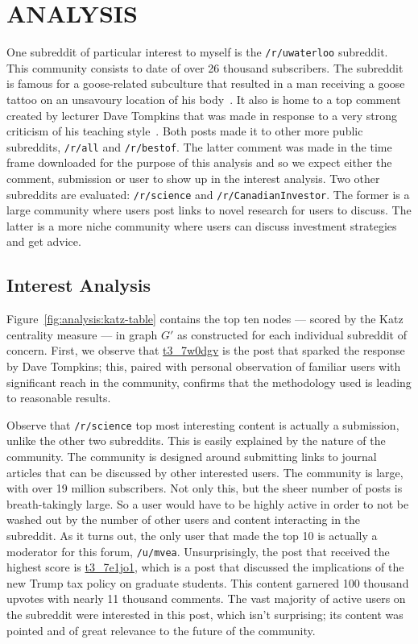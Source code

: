 \documentclass[letterpaper, 10 pt, conference]{ieeeconf}
\theoremstyle{definition}
\begin{document}
\section{ANALYSIS}\label{sec:analysis}
One subreddit of particular interest to myself is the \texttt{/r/uwaterloo} subreddit. This community consists to date of over 26 thousand subscribers. The subreddit is famous for a goose-related subculture that resulted in a man receiving a goose tattoo on an unsavoury location of his body~\cite{Website:GooseTattoo}. It also is home to a top comment created by lecturer Dave Tompkins that was made in response to a very strong criticism of his teaching style~\cite{Website:dtompkins}. Both posts made it to other more public subreddits, \texttt{/r/all} and \texttt{/r/bestof}. The latter comment was made in the time frame downloaded for the purpose of this analysis and so we expect either the comment, submission or user to show up in the interest analysis. Two other subreddits are evaluated: \texttt{/r/science} and \texttt{/r/CanadianInvestor}. The former is a large community where users post links to novel research for users to discuss. The latter is a more niche community where users can discuss investment strategies and get advice.

\subsection{Interest Analysis}\label{sec:analysis:interest}
Figure~\ref{fig:analysis:katz-table} contains the top ten nodes --- scored by the Katz centrality measure --- in graph \(G'\) as constructed for each individual subreddit of concern. First, we observe that \href{https://reddit.com/r/uwaterloo/comments/7w0dgv}{t3\_7w0dgv} is the post that sparked the response by Dave Tompkins; this, paired with personal observation of familiar users with significant reach in the community, confirms that the methodology used is leading to reasonable results.

Observe that \texttt{/r/science} top most interesting content is actually a submission, unlike the other two subreddits. This is easily explained by the nature of the community. The community is designed around submitting links to journal articles that can be discussed by other interested users. The community is large, with over 19 million subscribers. Not only this, but the sheer number of posts is breath-takingly large. So a user would have to be highly active in order to not be washed out by the number of other users and content interacting in the subreddit. As it turns out, the only user that made the top 10 is actually a moderator for this forum, \texttt{/u/mvea}. Unsurprisingly, the post that received the highest score is \href{https://reddit.com/r/science/comments/7e1jo1}{t3\_7e1jo1}, which is a post that discussed the implications of the new Trump tax policy on graduate students. This content garnered 100 thousand upvotes with nearly 11 thousand comments. The vast majority of active users on the subreddit were interested in this post, which isn't surprising; its content was pointed and of great relevance to the future of the community.
\end{document}

